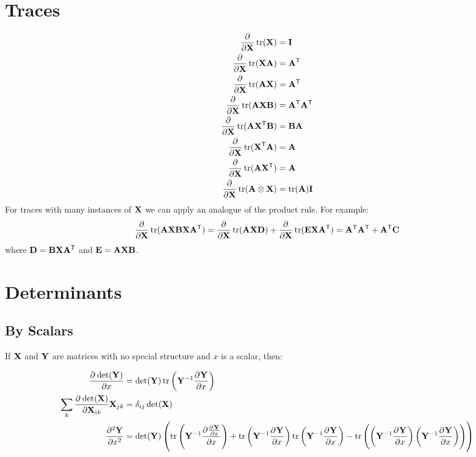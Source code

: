 \section{Traces}
\begin{align}
\pd{}{\mX}\trace(\mX)             &=\mI            \\
\pd{}{\mX}\trace(\mX\mA)          &=\mAT           \\
\pd{}{\mX}\trace(\mA\mX)          &=\mAT           \\
\pd{}{\mX}\trace(\mA\mX\mB)       &=\mAT\mBT       \\
\pd{}{\mX}\trace(\mA\mXT\mB)      &=\mB\mA         \\
\pd{}{\mX}\trace(\mXT\mA)         &=\mA            \\
\pd{}{\mX}\trace(\mA\mXT)         &=\mA            \\
\pd{}{\mX}\trace(\mA\kp\mX)       &=\trace(\mA)\mI
\end{align}
For traces with many instances of $\mX$ we can apply an analogue of the product rule. For example:
\begin{equation}
\pd{}{\mX}\trace(\mA\mX\mB\mX\mCT)=\pd{}{\mX}\trace(\mA\mX\mD)+\pd{}{\mX}\trace(\mE\mX\mCT)=\mAT\mDT+\mET\mC
\end{equation}
where $\mD=\mB\mX\mCT$ and $\mE=\mA\mX\mB$.

\section{Determinants}

\subsection{By Scalars}

If $\mX$ and $\mY$ are matrices with no special structure and $x$ is a scalar, then:

\begin{align}
\pd{\det(\mY)}{x} &= \det(\mY) \trace\left(\mYi \pd{\mY}{x}\right) \\
\sum_k \pd{\det(\mX)}{\mX_{ik}}\mX_{jk} &= \delta_{ij} \det(\mX)   \\
\pd[2]{\mY}{x^2} &= \det(\mY) %
  \left(
      \trace \left(\mYi \pd{\pd{\mY}{x}}{x}\right)
    + \trace \left(\mYi\pd{\mY}{x}\right) \trace\left(\mYi\pd{\mY}{x}\right)
    - \trace \left( \left(\mYi\pd{\mY}{x}\right) \left(\mYi\pd{\mY}{x}\right) \right)
  \right)
\end{align}

